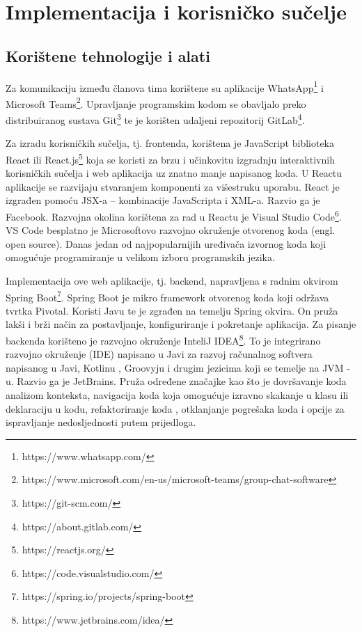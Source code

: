 \chapter{Implementacija i korisničko sučelje}
		
		
		\section{Korištene tehnologije i alati}
			Za komunikaciju između članova tima korištene su aplikacije WhatsApp\footnote{https://www.whatsapp.com/} i Microsoft Teams\footnote{https://www.microsoft.com/en-us/microsoft-teams/group-chat-software}. Upravljanje programskim kodom se obavljalo preko distribuiranog sustava Git\footnote{https://git-scm.com/} te je korišten udaljeni repozitorij GitLab\footnote{https://about.gitlab.com/}.
			
			Za izradu korisničkih sučelja, tj. frontenda, korištena je JavaScript biblioteka React ili React.js\footnote{https://reactjs.org/} koja se koristi za brzu i učinkovitu izgradnju interaktivnih korisničkih sučelja i web aplikacija uz znatno manje napisanog koda. U Reactu aplikacije se razvijaju stvaranjem komponenti za višestruku uporabu. React je izgrađen pomoću JSX-a – kombinacije JavaScripta i XML-a. Razvio ga je Facebook. Razvojna okolina korištena za rad u Reactu je Visual Studio Code\footnote{https://code.visualstudio.com/}. VS Code besplatno je Microsoftovo razvojno okruženje otvorenog koda (engl. open source). Danas jedan od najpopularnijih uređivača izvornog koda koji omogućuje programiranje u velikom izboru programskih jezika. 
			
			Implementacija ove web aplikacije, tj. backend, napravljena s radnim okvirom Spring Boot\footnote{https://spring.io/projects/spring-boot}. Spring Boot je mikro framework otvorenog koda koji održava tvrtka Pivotal. Koristi Javu te je zgrađen na temelju Spring okvira. On pruža lakši i brži način za postavljanje, konfiguriranje i pokretanje aplikacija. Za pisanje backenda korišteno je razvojno okruženje InteliJ IDEA\footnote{https://www.jetbrains.com/idea/}. To je integrirano razvojno okruženje (IDE) napisano u Javi za razvoj računalnog softvera napisanog u Javi, Kotlinu , Groovyju i drugim jezicima koji se temelje na JVM -u. Razvio ga je JetBrains. Pruža određene značajke kao što je dovršavanje koda analizom konteksta, navigacija koda koja omogućuje izravno skakanje u klasu ili deklaraciju u kodu, refaktoriranje koda , otklanjanje pogrešaka koda i opcije za ispravljanje nedosljednosti putem prijedloga.
			
